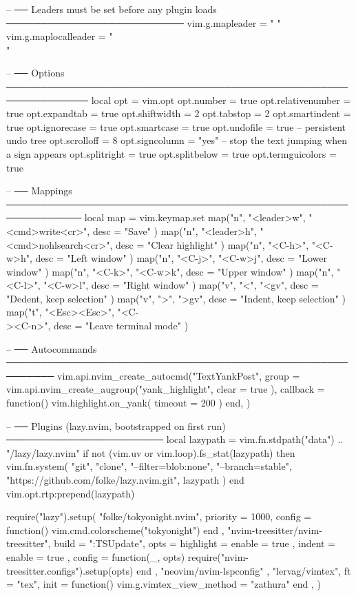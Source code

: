 \begin{luacode}
-- ── Leaders must be set before any plugin loads ──────────────────────────
vim.g.mapleader = " "
vim.g.maplocalleader = "\\"

-- ── Options ──────────────────────────────────────────────────────────────
local opt = vim.opt
opt.number = true
opt.relativenumber = true
opt.expandtab = true
opt.shiftwidth = 2
opt.tabstop = 2
opt.smartindent = true
opt.ignorecase = true
opt.smartcase = true
opt.undofile = true          -- persistent undo tree
opt.scrolloff = 8
opt.signcolumn = "yes"       -- stop the text jumping when a sign appears
opt.splitright = true
opt.splitbelow = true
opt.termguicolors = true

-- ── Mappings ─────────────────────────────────────────────────────────────
local map = vim.keymap.set
map("n", "<leader>w", "<cmd>write<cr>", { desc = "Save" })
map("n", "<leader>h", "<cmd>nohlsearch<cr>", { desc = "Clear highlight" })
map("n", "<C-h>", "<C-w>h", { desc = "Left window" })
map("n", "<C-j>", "<C-w>j", { desc = "Lower window" })
map("n", "<C-k>", "<C-w>k", { desc = "Upper window" })
map("n", "<C-l>", "<C-w>l", { desc = "Right window" })
map("v", "<", "<gv", { desc = "Dedent, keep selection" })
map("v", ">", ">gv", { desc = "Indent, keep selection" })
map("t", "<Esc><Esc>", "<C-\\><C-n>", { desc = "Leave terminal mode" })

-- ── Autocommands ─────────────────────────────────────────────────────────
vim.api.nvim_create_autocmd("TextYankPost", {
  group = vim.api.nvim_create_augroup("yank_highlight", { clear = true }),
  callback = function() vim.highlight.on_yank({ timeout = 200 }) end,
})

-- ── Plugins (lazy.nvim, bootstrapped on first run) ───────────────────────
local lazypath = vim.fn.stdpath("data") .. "/lazy/lazy.nvim"
if not (vim.uv or vim.loop).fs_stat(lazypath) then
  vim.fn.system({ "git", "clone", "--filter=blob:none", "--branch=stable",
    "https://github.com/folke/lazy.nvim.git", lazypath })
end
vim.opt.rtp:prepend(lazypath)

require("lazy").setup({
  { "folke/tokyonight.nvim", priority = 1000,
    config = function() vim.cmd.colorscheme("tokyonight") end },
  { "nvim-treesitter/nvim-treesitter", build = ":TSUpdate",
    opts = { highlight = { enable = true }, indent = { enable = true } },
    config = function(_, opts)
      require("nvim-treesitter.configs").setup(opts)
    end },
  { "neovim/nvim-lspconfig" },
  { "lervag/vimtex", ft = "tex", init = function()
      vim.g.vimtex_view_method = "zathura"
    end },
})
\end{luacode}
